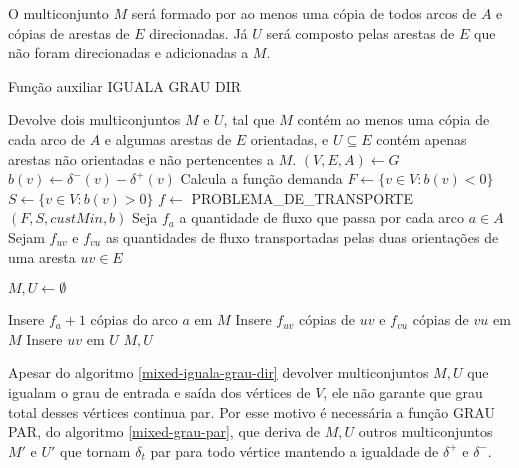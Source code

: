     O multiconjunto $M$ será formado por ao menos uma cópia de todos arcos de $A$ e cópias de arestas de $E$ direcionadas.
    Já $U$ será composto pelas arestas de $E$ que não foram direcionadas e adicionadas a $M$.

    \begin{algorithm}
    \caption{Função auxiliar IGUALA GRAU DIR}
    \label{mixed-iguala-grau-dir}
    \begin{algorithmic}[1]
    \State \Comment Devolve dois multiconjuntos $M$ e $U$, tal que $M$ contém ao menos uma cópia de cada arco de $A$ e algumas arestas de $E$ orientadas, e $U \subseteq E$ contém apenas arestas não orientadas e não pertencentes a $M$.
        \State $(V, E, A) \gets G$
            \State $b(v) \gets \delta^-(v) - \delta^+(v)$ \Comment Calcula a função demanda
        \EndFor
        \State $F \gets \{v \in V : b(v) < 0\}$
        \State $S \gets \{v \in V : b(v) > 0\}$
        \State $f \gets $ PROBLEMA\_DE\_TRANSPORTE$(F, S, custMin, b)$
        \State Seja $f_a$ a quantidade de fluxo que passa por cada arco $a \in A$ 
        \State Sejam $f_{uv}$ e $f_{vu}$ as quantidades de fluxo transportadas pelas duas orientações de uma aresta $uv \in E$

        \State $M, U \gets \emptyset$

            \State Insere $f_a + 1$ cópias do arco $a$ em $M$
        \EndFor
                \State Insere $f_{uv}$ cópias de $uv$ e $f_{vu}$ cópias de $vu$ em $M$
            \Else 
                \State Insere $uv$ em $U$ 
            \EndIf
        \EndFor
        \State \Return $M, U$
    \EndFunction
    \end{algorithmic}
    \end{algorithm}

    Apesar do algoritmo \ref{mixed-iguala-grau-dir} devolver multiconjuntos $M, U$ que igualam o grau de entrada e saída dos vértices de $V$, ele não garante que grau total desses vértices continua par.
    Por esse motivo é necessária a função GRAU PAR, do algoritmo \ref{mixed-grau-par}, que deriva de $M, U$ outros multiconjuntos $M'$ e $U'$ que tornam $\delta_t$ par para todo vértice mantendo a igualdade de $\delta^+$ e $\delta^-$.

